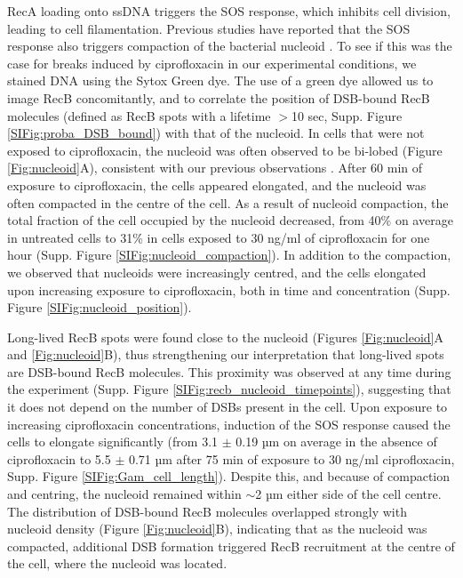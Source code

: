 RecA loading onto ssDNA triggers the SOS response, which inhibits cell division, leading to cell filamentation. Previous studies have reported that the SOS response also triggers compaction of the bacterial nucleoid \cite{Odsbu2014}. To see if this was the case for breaks induced by ciprofloxacin in our experimental conditions, we stained DNA using the Sytox Green dye. The use of a green dye allowed us to image RecB concomitantly, and to correlate the position of DSB-bound RecB molecules (defined as RecB spots with a lifetime $>$10 sec, Supp. Figure \ref{SIFig:proba_DSB_bound}) with that of the nucleoid. In cells that were not exposed to ciprofloxacin, the nucleoid was often observed to be bi-lobed (Figure \ref{Fig:nucleoid}A), consistent with our previous observations \cite{Lepore2025}. After 60 min of exposure to ciprofloxacin, the cells appeared elongated, and the nucleoid was often compacted in the centre of the cell. As a result of nucleoid compaction, the total fraction of the cell occupied by the nucleoid decreased, from 40\% on average in untreated cells to 31\% in cells exposed to 30 ng/ml of ciprofloxacin for one hour (Supp. Figure \ref{SIFig:nucleoid_compaction}). In addition to the compaction, we observed that nucleoids were increasingly centred, and the cells elongated upon increasing exposure to ciprofloxacin, both in time and concentration (Supp. Figure \ref{SIFig:nucleoid_position}).

Long-lived RecB spots were found close to the nucleoid (Figures \ref{Fig:nucleoid}A and \ref{Fig:nucleoid}B), thus strengthening our interpretation that long-lived spots are DSB-bound RecB molecules. This proximity was observed at any time during the experiment (Supp. Figure \ref{SIFig:recb_nucleoid_timepoints}), suggesting that it does not depend on the number of DSBs present in the cell. Upon exposure to increasing ciprofloxacin concentrations, induction of the SOS response caused the cells to elongate significantly (from 3.1 $\pm$ 0.19 µm on average in the absence of ciprofloxacin to 5.5 $\pm$ 0.71 µm after 75 min of exposure to 30 ng/ml ciprofloxacin, Supp. Figure \ref{SIFig:Gam_cell_length}). Despite this, and because of compaction and centring, the nucleoid remained within $\sim$2 µm either side of the cell centre. The distribution of DSB-bound RecB molecules overlapped strongly with nucleoid density (Figure \ref{Fig:nucleoid}B), indicating that as the nucleoid was compacted, additional DSB formation triggered RecB recruitment at the centre of the cell, where the nucleoid was located.

